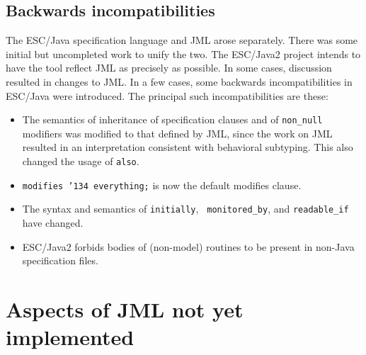 \documentclass{acm_proc_article-sp}
\begin{document}
\subsection{Backwards incompatibilities}
The ESC/Java specification language and JML arose separately.  There
was some initial but uncompleted work to unify the two.  The ESC/Java2
project intends to have the tool reflect JML as precisely as possible.
In some cases, discussion resulted in changes to JML.  In
a few cases, some backwards incompatibilities in ESC/Java were
introduced.  The principal such incompatibilities are these:
\setlength{\partopsep}{0in}\setlength{\parskip}{0in}\setlength{\itemsep}{0in}\setlength{\topsep}{0in}
\begin{itemize}
\setlength{\partopsep}{0in}\setlength{\parskip}{0in}\setlength{\itemsep}{0in}\setlength{\topsep}{0in}
\item The semantics of inheritance of specification clauses and of
  \texttt{non\_null} modifiers was modified to that defined by JML, since
  the work on JML resulted in an interpretation consistent with
  behavioral subtyping.  This also changed the usage of \texttt{also}.
\item \texttt{modifies \char'134 everything;} is now the default modifies clause.
\item The syntax and semantics of \texttt{initially}, {\tt
    monitored\_by}, and \texttt{readable\_if} have changed.
\item ESC/Java2 
  forbids bodies of (non-model) routines to be present in non-Java
  specification files.
\end{itemize}

\section{Aspects of JML not yet implemented}
\end{document}
